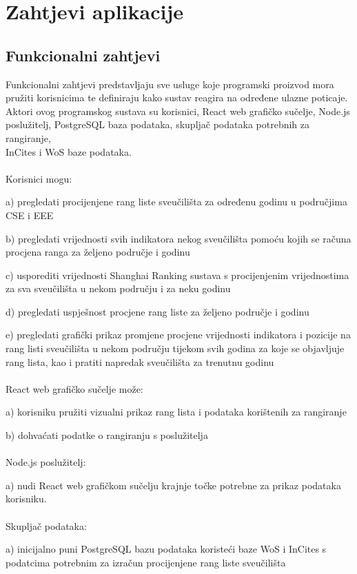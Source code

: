 \documentclass[times, utf8, zavrsni]{fer}
\begin{document}
\chapter{Zahtjevi aplikacije}
\section{Funkcionalni zahtjevi}
Funkcionalni zahtjevi predstavljaju sve usluge koje programski proizvod mora pružiti korisnicima te definiraju kako sustav reagira na određene ulazne poticaje.
\\ Aktori ovog programskog sustava su korisnici, React web grafičko sučelje, Node.js poslužitelj, PostgreSQL baza podataka, skupljač podataka potrebnih za rangiranje, 
\\InCites i WoS baze podataka.
\\
\\Korisnici mogu:

a) pregledati procijenjene rang liste sveučilišta za određenu godinu u područjima CSE i EEE

b) pregledati vrijednosti svih indikatora nekog sveučilišta pomoću kojih se računa procjena ranga za željeno područje i godinu

c) usporediti vrijednosti Shanghai Ranking sustava s procijenjenim vrijednostima za sva sveučilišta u nekom području i za neku godinu

d) pregledati uspješnost procjene rang liste za željeno područje i godinu

e) pregledati grafički prikaz promjene procjene vrijednosti indikatora i pozicije na rang listi sveučilišta u nekom području tijekom svih godina 
za koje se objavljuje rang lista, kao i pratiti napredak sveučilišta za trenutnu godinu
\\
\\React web grafičko sučelje može:

a) korisniku pružiti vizualni prikaz rang lista i podataka korištenih za rangiranje

b) dohvaćati podatke o rangiranju s poslužitelja
\\
\\Node.js poslužitelj:

a) nudi React web grafičkom sučelju krajnje točke potrebne za prikaz podataka korisniku.
\\\\
Skupljač podataka:

a) inicijalno puni PostgreSQL bazu podataka koristeći baze WoS i InCites s \\podatcima potrebnim za izračun procijenjene rang liste sveučilišta
\end{document}
